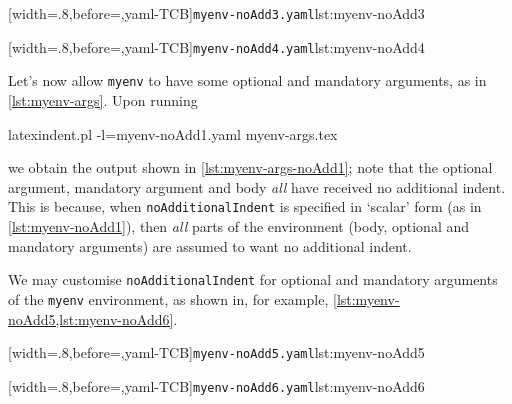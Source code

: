 \begin{minipage}{.45\textwidth}
[width=.8\linewidth,before=\centering,yaml-TCB]{\texttt{myenv-noAdd3.yaml}}{lst:myenv-noAdd3}
\end{minipage}
\hfill
\begin{minipage}{.45\textwidth}
[width=.8\linewidth,before=\centering,yaml-TCB]{\texttt{myenv-noAdd4.yaml}}{lst:myenv-noAdd4}
\end{minipage}


Let's now allow \texttt{myenv} to have some optional and mandatory arguments, as in \cref{lst:myenv-args}.
Upon running
\begin{commandshell}
latexindent.pl -l=myenv-noAdd1.yaml myenv-args.tex  
\end{commandshell}
we obtain the output shown in \cref{lst:myenv-args-noAdd1}; note that the optional argument, mandatory argument and body \emph{all} 
have received no additional indent. This is because, when \texttt{noAdditionalIndent} is specified in `scalar' form (as in \cref{lst:myenv-noAdd1}), 
then \emph{all} parts of the environment (body, optional and mandatory arguments) are assumed to want no additional indent.

We may customise \texttt{noAdditionalIndent} for optional and mandatory arguments of the \texttt{myenv} environment, as shown in, for example, \cref{lst:myenv-noAdd5,lst:myenv-noAdd6}.

\begin{minipage}{.49\textwidth}
[width=.8\linewidth,before=\centering,yaml-TCB]{\texttt{myenv-noAdd5.yaml}}{lst:myenv-noAdd5}
\end{minipage}
\hfill
\begin{minipage}{.49\textwidth}
[width=.8\linewidth,before=\centering,yaml-TCB]{\texttt{myenv-noAdd6.yaml}}{lst:myenv-noAdd6}
\end{minipage}


